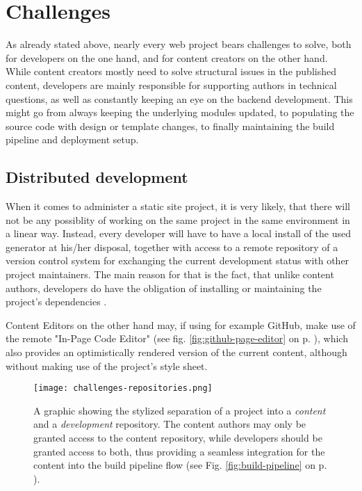 \section{Challenges}
\label{sec:challenges}

As already stated above, nearly every web project bears challenges to solve, both for developers on the one hand, and for content creators on the other hand. While content creators mostly need to solve structural issues in the published content, developers are mainly responsible for supporting authors in technical questions, as well as constantly keeping an eye on the backend development. This might go from always keeping the underlying modules updated, to populating the source code with design or template changes, to finally maintaining the build pipeline and deployment setup.

\subsection{Distributed development}
\label{sec:challenges-distributeddevelopment}

When it comes to administer a static site project, it is very likely, that there will not be any possiblity of working on the same project in the same environment in a linear way. Instead, every developer will have to have a local install of the used generator at his/her disposal, together with access to a remote repository of a version control system for exchanging the current development status with other project maintainers. The main reason for that is the fact, that unlike content authors, developers do have the obligation of installing or maintaining the project's dependencies \cite[85]{dhillon2016}.

Content Editors on the other hand may, if using for example GitHub, make use of the remote "In-Page Code Editor" (see fig. \ref{fig:github-page-editor} on p. \pageref{fig:github-page-editor}), which also provides an optimistically rendered version of the current content, although without making use of the project's style sheet.

\begin{figure} %
    \centering
    \texttt{[image: challenges-repositories.png]}
    \caption{A graphic showing the stylized separation of a project into a \emph{content} and a \emph{development} repository. The content authors may only be granted access to the content repository, while developers should be granted access to both, thus providing a seamless integration for the content into the build pipeline flow (see Fig. \ref{fig:build-pipeline} on p. \pageref{fig:build-pipeline}).}
    \label{fig:repository-separation}
\end{figure}
%

